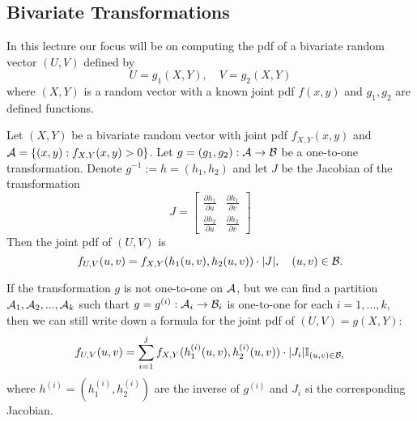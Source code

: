 \section{}
\subsection{Bivariate Transformations}
In this lecture our focus will be on computing the pdf of a bivariate random vector $(U,V)$ defined by
$$
U = g_1(X,Y), \quad V = g_2(X,Y)
$$
where $(X,Y)$ is a random vector with a known joint pdf $f(x,y)$ and $g_1,g_2$ are defined functions.

\begin{theorem}
Let $(X,Y)$ be a bivariate random vector with joint pdf $f_{X,Y}(x,y)$ and $\mathcal A = \{
(x,y): f_{X,Y}(x,y)>0
\}$.
Let $g=(g_1,g_2): \mathcal A \to \mathcal B$ be a one-to-one transformation. Denote $g^{-1}:=h = (h_1,h_2)$ and let $J$ be the Jacobian of the transformation
    $$
    J = 
    \begin{bmatrix} \frac{\partial h_1}{\partial u} &
    \frac{\partial h_1}{\partial v} \\ 
    \frac{\partial h_2}{\partial u} & 
    \frac{\partial h_2}{\partial v}
    \end{bmatrix}
    $$
  Then the joint pdf of $(U,V)$ is 
  $$
  f_{U,V}(u,v) = f_{X,Y}(h_1(u,v),h_2(u,v)) \cdot |J|, \quad (u,v) \in \mathcal B.
  $$
\end{theorem}
If the transformation $g$ is not one-to-one on $\mathcal A$, but we can find a partition $\mathcal A_1,\mathcal A_2,...,\mathcal A_k$ such thart $g = g^{(i)}:\mathcal A_i \to \mathcal B_i$ is one-to-one for each $i = 1,...,k$, then we can still write down a formula for the joint pdf of $(U,V) = g(X,Y)$:
$$
f_{U,V}(u,v) = \sum_{i=1}^{j}f_{X,Y}(h_1^{(i)}(u,v),h_2^{(i)}(u,v)) \cdot |J_i|\mathbb I_{(u,v) \in \mathcal B_i}
$$
where $h^{(i)} = (h_1^{(i)},h_2^{(i)})$ are the inverse of $g^{(i)}$ and $J_i$ si the corresponding Jacobian.